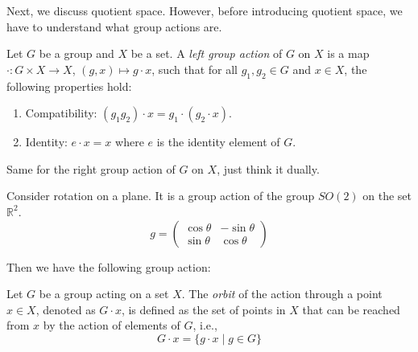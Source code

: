 \documentclass[
	11pt, %
	fleqn, %
	a4paper, %
]{LegrandOrangeBook}
\begin{document}
Next, we discuss quotient space. However, before introducing quotient space, we have to understand what group actions are. 

\begin{definition}
    Let $G$ be a group and $X$ be a set. A \emph{left group action} of $G$ on $X$ is a map $\cdot : G \times X \to X$, $(g, x) \mapsto g \cdot x$, such that for all $g_1, g_2 \in G$ and $x \in X$, the following properties hold:
    \begin{enumerate}
        \item Compatibility: $(g_1 g_2) \cdot x = g_1 \cdot (g_2 \cdot x)$.
        \item Identity: $e \cdot x = x$ where $e$ is the identity element of $G$.
    \end{enumerate}
\end{definition}

Same for the right group action of $G$ on $X$, just think it dually.

Consider rotation on a plane. It is a group action of the group $SO(2)$ on the set $\mathbb{R}^2$.
\[
    g = \begin{pmatrix}
        \cos{\theta} & -\sin{\theta} \\
        \sin{\theta} & \cos{\theta}
    \end{pmatrix}
\]

Then we have the following group action:
\begin{center}
\end{center}

\begin{definition}[Orbits]
    Let $G$ be a group acting on a set $X$. The \emph{orbit} of the action through a point $x \in X$, denoted as $G \cdot x$, is defined as the set of points in $X$ that can be reached from $x$ by the action of elements of $G$, i.e., 
    \[
        G \cdot x = \{g \cdot x \mid g \in G\}
    \]
\end{definition}
\end{document}
